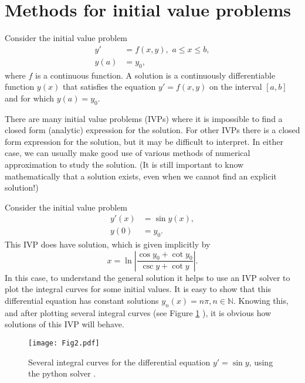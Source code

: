 \label{lab:IVP}


\section*{Methods for initial value problems}
Consider the initial value problem 
\begin{align*}
y' &= f(x,y),\,\, a \leq x \leq b, \\
y(a) &= y_0,
\end{align*}
where $f$ is a continuous function. A solution is a continuously differentiable function $y(x)$ that satisfies the equation $y' = f(x,y)$ on the interval $[a,b]$ and for which $y(a) = y_0$.  

There are many initial value problems (IVPs) where it is impossible to find a closed form (analytic) expression for the solution. 
For other IVPs there is a closed form expression for the solution, but it may be difficult to interpret. 
In either case, we can usually make good use of various methods of numerical approximation to study the solution. (It is still important to know mathematically that a solution exists, even when we cannot find an explicit solution!)

Consider the initial value problem 
\begin{align*}
y'(x) &= \sin y(x), \\
y(0) &= y_0.
\end{align*}
This IVP does have solution, which is given implicitly by 
\[x = \ln \left|\frac{\cos y_0 + \cot y_0}{\csc y + \cot y} \right|.\]
In this case, to understand the general solution it helps to use an IVP solver to plot the integral curves for some initial values. It is easy to show that this differential equation has constant solutions $y_n(x) = n \pi, n \in \mathbb{N}$. Knowing this, and after plotting several integral curves (see Figure \ref{ivp:int_curves} ), it is obvious how solutions of this IVP will behave.

\begin{figure}
\centering
\texttt{[image: Fig2.pdf]}
\caption{Several integral curves for the differential equation $y' =\sin y$, using the python solver . }
\label{ivp:int_curves}
\end{figure}



